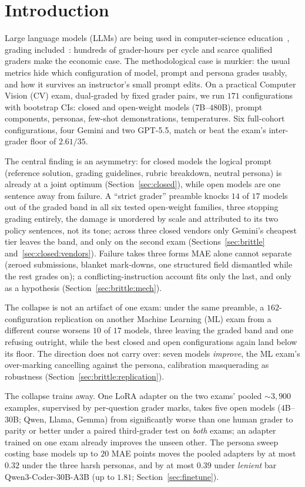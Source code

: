 \section{Introduction}
\label{sec:intro}

Large language models (LLMs) are being used in computer-science education~\citep{prather2023robotsherenavigatinggenerative}, grading included~\citep{phung2023generativeaiprogrammingeducation}: hundreds of grader-hours per cycle and scarce qualified graders make the economic case. The methodological case is murkier: the usual metrics hide which configuration of model, prompt and persona grades usably, and how it survives an instructor's small prompt edits. On a practical Computer Vision (CV) exam, dual-graded by fixed grader pairs, we run $171$ configurations with bootstrap CIs: closed and open-weight models ($7$B--$480$B), prompt components, personas, few-shot demonstrations, temperatures. Six full-cohort configurations, four Gemini and two GPT-5.5, match or beat the exam's inter-grader floor of $2.61/35$.

The central finding is an asymmetry: for closed models  the logical prompt (reference solution, grading guidelines, rubric breakdown, neutral persona) is already at a joint optimum (Section~\ref{sec:closed}), while open models are one sentence away from failure. A ``strict grader'' preamble knocks $14$ of $17$ models out of the graded band in all six tested open-weight families, three stopping grading entirely, the damage is unordered by scale and attributed to its two policy sentences, not its tone; across three closed vendors only Gemini's cheapest tier leaves the band, and only on the second exam (Sections~\ref{sec:brittle} and~\ref{sec:closed:vendors}). Failure takes three forms MAE alone cannot separate (zeroed submissions, blanket mark-downs, one structured field dismantled while the rest grades on); a conflicting-instruction account fits only the last, and only as a hypothesis (Section~\ref{sec:brittle:mech}).

The collapse is not an artifact  of one exam: under the same preamble, a $162$-configuration replication on another Machine Learning (ML) exam from a different course worsens $10$ of $17$ models, three leaving the graded band and one refusing outright, while the best closed and open configurations again land below its floor. The direction does not carry over: seven models \emph{improve}, the ML exam's over-marking cancelling against the persona, calibration masquerading as robustness (Section~\ref{sec:brittle:replication}).

The collapse trains away. One LoRA adapter on the two exams' pooled $\sim 3{,}900$ examples, supervised by per-question grader marks, takes five open models ($4$B--$30$B; Qwen, Llama, Gemma) from significantly worse than one human grader to parity or better under a paired third-grader test on \emph{both} exams; an adapter trained on one exam already improves the unseen other. The persona sweep costing base models up to $20$ MAE points moves the pooled adapters by at most $0.32$ under the three harsh personas, and by at most $0.39$ under \emph{lenient} bar Qwen3-Coder-$30$B-A$3$B (up to $1.81$; Section~\ref{sec:finetune}).

